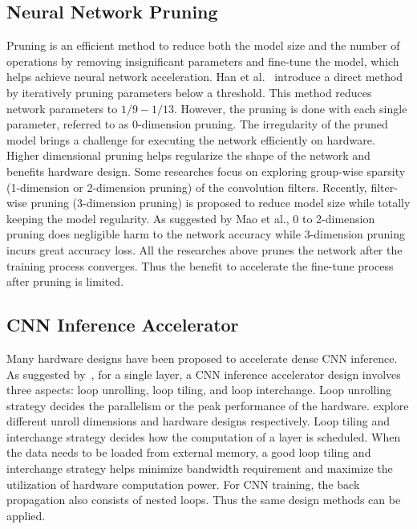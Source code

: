 \subsection{Neural Network Pruning}\label{sec:rw:prune}
Pruning is an efficient method to reduce both the model size and the number of operations by removing insignificant parameters and fine-tune the model, which helps achieve neural network acceleration. Han et al.~\cite{han2015learning} introduce a direct method by iteratively pruning parameters below a threshold. This method reduces network parameters to $1/9-1/13$. However, the pruning is done with each single parameter, referred to as 0-dimension pruning. The irregularity of the pruned model brings a challenge for executing the network efficiently on hardware. Higher dimensional pruning helps regularize the shape of the network and benefits hardware design. Some researches focus on exploring group-wise sparsity (1-dimension or 2-dimension pruning)\cite{lebedev2016fast,zhou2016less,wen2016learning} of the convolution filters. Recently, filter-wise pruning (3-dimension pruning)\cite{molchanov2016pruning,li2016pruning} is proposed to reduce model size while totally keeping the model regularity. As suggested by Mao et al.\cite{mao2017exploring}, 0 to 2-dimension pruning does negligible harm to the network accuracy while 3-dimension pruning incurs great accuracy loss. All the researches above prunes the network after the training process converges. Thus the benefit to accelerate the fine-tune process after pruning is limited.

\subsection{CNN Inference Accelerator}\label{sec:rw:inference_acc}
Many hardware designs have been proposed to accelerate dense CNN inference. As suggested by~\cite{ma2017optimizing}, for a single layer, a CNN inference accelerator design involves three aspects: loop unrolling, loop tiling, and loop interchange. Loop unrolling strategy decides the parallelism or the peak performance of the hardware. \cite{zhang2015optimizing, du2015shidiannao, qiu2016going} explore different unroll dimensions and hardware designs respectively. Loop tiling and interchange strategy decides how the computation of a layer is scheduled. When the data needs to be loaded from external memory, a good loop tiling and interchange strategy helps minimize bandwidth requirement and maximize the utilization of hardware computation power. For CNN training, the back propagation also consists of nested loops. Thus the same design methods can be applied.

